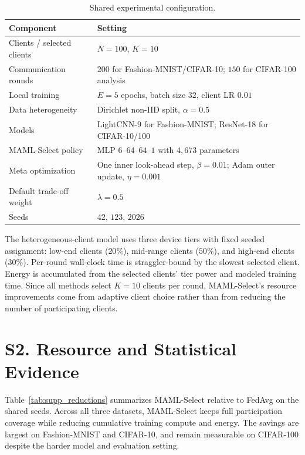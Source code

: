 \documentclass[10pt]{article}
\begin{document}
\begin{table}[!ht]
\centering
\caption{Shared experimental configuration.}
\label{tab:supp_config}
\small
\begin{tabular}{@{}ll@{}}
\toprule
Component & Setting \\
\midrule
Clients / selected clients & $N=100$, $K=10$ \\
Communication rounds & $200$ for Fashion-MNIST/CIFAR-10; $150$ for CIFAR-100 analysis \\
Local training & $E=5$ epochs, batch size $32$, client LR $0.01$ \\
Data heterogeneity & Dirichlet non-IID split, $\alpha=0.5$ \\
Models & LightCNN-9 for Fashion-MNIST; ResNet-18 for CIFAR-10/100 \\
MAML-Select policy & MLP $6$--$64$--$64$--$1$ with $4{,}673$ parameters \\
Meta optimization & One inner look-ahead step, $\beta=0.01$; Adam outer update, $\eta=0.001$ \\
Default trade-off weight & $\lambda=0.5$ \\
Seeds & $42$, $123$, $2026$ \\
\bottomrule
\end{tabular}
\end{table}

The heterogeneous-client model uses three device tiers with fixed seeded assignment: low-end clients ($20\%$), mid-range clients ($50\%$), and high-end clients ($30\%$).  Per-round wall-clock time is straggler-bound by the slowest selected client.  Energy is accumulated from the selected clients' tier power and modeled training time.  Since all methods select $K=10$ clients per round, MAML-Select's resource improvements come from adaptive client choice rather than from reducing the number of participating clients.

\section*{S2. Resource and Statistical Evidence}

Table~\ref{tab:supp_reductions} summarizes MAML-Select relative to FedAvg on the shared seeds.  Across all three datasets, MAML-Select keeps full participation coverage while reducing cumulative training compute and energy.  The savings are largest on Fashion-MNIST and CIFAR-10, and remain measurable on CIFAR-100 despite the harder model and evaluation setting.
\end{document}
